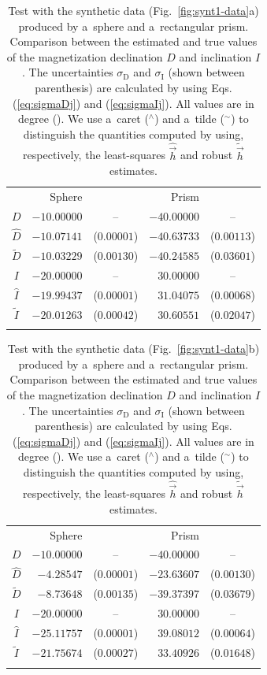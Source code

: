 \documentclass[journal abbreviation, npg]{copernicus}
\begin{document}
\begin{table}[t]
\caption{Test with the synthetic data (Fig.~\ref{fig:synt1-data}a) produced
by a~sphere and a~rectangular prism. Comparison between the estimated and
true values of the magnetization declination $D$ and inclination $I$. The
uncertainties $\sigma_\mathrm{D}$ and $\sigma_\mathrm{I}$ (shown between 
parenthesis) are calculated by
using Eqs. (\ref{eq:sigmaDj}) and (\ref{eq:sigmaIj}). All values are in
degree ({\degree}). We use a~caret ($^{\wedge}$) and a~tilde ($^{\sim}$) to
distinguish the quantities computed by using, respectively, the least-squares
$\hat{\vec{h}}$ and robust $\tilde{\vec{h}}$ estimates.}
\begin{tabular}{crcrc}
\tophline
&Sphere & &Prism & \\
\middlehline
$D$ &$-10.00000$ & -- &$-40.00000$ & -- \\
$\hat{D}$ &$-10.07141$ &($0.00001$) &$-40.63733$ &($0.00113$) \\
$\tilde{D}$ &$-10.03229$ &($0.00130$) &$-40.24585$ &($0.03601$) \\
\middlehline
$I$ &$-20.00000$ & -- &$30.00000$ & -- \\
$\hat{I}$ &$-19.99437$ &($0.00001$) &$31.04075$ &($0.00068$) \\
$\tilde{I}$ &$-20.01263$ &($0.00042$) &$30.60551$ &($0.02047$) \\
\bottomhline
\end{tabular}
\label{tab:synt1-without-inter-anomaly}
\end{table}

\begin{table}[t]
\caption{Test with the synthetic data (Fig.~\ref{fig:synt1-data}b) produced
by a~sphere and a~rectangular prism. Comparison between the estimated and
true values of the magnetization declination $D$ and inclination $I$. The
uncertainties $\sigma_\mathrm{D}$ and $\sigma_\mathrm{I}$ (shown between 
parenthesis) are calculated by
using Eqs. (\ref{eq:sigmaDj}) and (\ref{eq:sigmaIj}). All values are in
degree ({\degree}). We use a~caret ($^{\wedge}$) and a~tilde ($^{\sim}$) to
distinguish the quantities computed by using, respectively, the least-squares
$\hat{\vec{h}}$ and robust $\tilde{\vec{h}}$ estimates.}
\begin{tabular}{crcrc}
\tophline
&Sphere & &Prism & \\
\middlehline
$D$ &$-10.00000$ & -- &$-40.00000$ & -- \\
$\hat{D}$ &$-4.28547$ &($0.00001$) &$-23.63607$  &($0.00130$) \\
$\tilde{D}$ &$-8.73648$ &($0.00135$) &$-39.37397$ &($0.03679$) \\
\middlehline
$I$ &$-20.00000$ & -- &$30.00000$ & -- \\
$\hat{I}$ &$-25.11757$ &($0.00001$) &$39.08012$  &($0.00064$) \\
$\tilde{I}$ &$-21.75674$ &($0.00027$) &$33.40926$ &($0.01648$) \\
\bottomhline
\end{tabular}
\label{tab:synt1-with-inter-anomaly}
\end{table}
\end{document}

